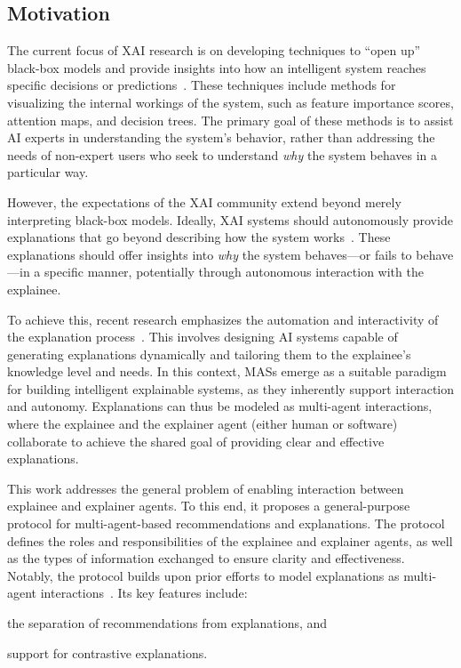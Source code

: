 \subsection{Motivation}\label{subsec:introduction-general-purpose-protocol-for-multi-agent-based-explanations}
%
The current focus of \gls{XAI} research is on developing techniques to ``open up'' black-box models and provide insights into how an intelligent system reaches specific decisions or predictions~\cite{DBLP:journals/csur/GuidottiMRTGP19}.
%
These techniques include methods for visualizing the internal workings of the system, such as feature importance scores, attention maps, and decision trees.
%
The primary goal of these methods is to assist \gls{AI} experts in understanding the system's behavior, rather than addressing the needs of non-expert users who seek to understand \emph{why} the system behaves in a particular way.

However, the expectations of the \gls{XAI} community extend beyond merely interpreting black-box models.
%
Ideally, \gls{XAI} systems should autonomously provide explanations that go beyond describing how the system works~\cite{DBLP:conf/aiia/CiattoCOC19}.
%
These explanations should offer insights into \emph{why} the system behaves—or fails to behave—in a specific manner, potentially through autonomous interaction with the explainee.

To achieve this, recent research emphasizes the automation and interactivity of the explanation process~\cite{DBLP:conf/atal/CiattoSOC20}.
%
This involves designing \gls{AI} systems capable of generating explanations dynamically and tailoring them to the explainee's knowledge level and needs.
%
In this context, \glspl{MAS} emerge as a suitable paradigm for building intelligent explainable systems, as they inherently support interaction and autonomy.
%
Explanations can thus be modeled as multi-agent interactions, where the explainee and the explainer agent (either human or software) collaborate to achieve the shared goal of providing clear and effective explanations.

This work addresses the general problem of enabling interaction between explainee and explainer agents.
%
To this end, it proposes a general-purpose protocol for multi-agent-based recommendations and explanations.
%
The protocol defines the roles and responsibilities of the explainee and explainer agents, as well as the types of information exchanged to ensure clarity and effectiveness.
%
Notably, the protocol builds upon prior efforts to model explanations as multi-agent interactions~\cite{buzcu-prima-2022}.
%
Its key features include:
%
\begin{inlinelist}
    \item the separation of recommendations from explanations, and
    \item support for contrastive explanations.
\end{inlinelist}

